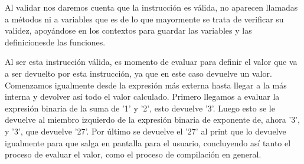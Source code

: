 \documentclass[12pt]{article}
\begin{document}
	Al validar nos daremos cuenta que la instrucción es válida, no aparecen llamadas a métodos ni a variables que es de lo que mayormente se trata de verificar su validez, apoyándose en los contextos para guardar las variables y las definicionesde las funciones.
	
	Al ser esta instrucción válida, es momento de evaluar para definir el valor que va a ser devuelto por esta instrucción, ya que en este caso devuelve un valor.
	Comenzamos igualmente desde la expresión más externa hasta llegar a la más interna y devolver así todo el valor calculado.
	Primero llegamos a evaluar la expresión binaria de la suma de '1' y '2', esto devuelve '3'.
	Luego esto se le devuelve al miembro izquierdo de la expresión binaria de exponente de, ahora '3', y '3', que devuelve '27'.
	Por último se devuelve el '27' al print que lo devuelve igualmente para que salga en pantalla para el usuario, concluyendo así tanto el proceso de evaluar el valor, como el proceso de compilación en general.
\end{document}
